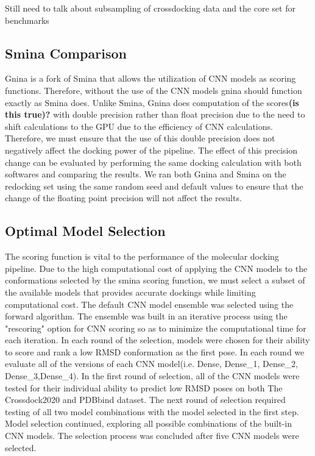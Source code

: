 \documentclass[journal=jcisd8,manuscript=article]{achemso}
\begin{document}
Still need to talk about subsampling of crossdocking data and the core set for benchmarks

\subsection{Smina Comparison}
Gnina is a fork of Smina that allows the utilization of CNN models as scoring functions. Therefore, without the use of the CNN models gnina should function exactly as Smina does. Unlike Smina, Gnina does computation of the scores\textbf{(is this true)?} with double precision rather than float precision due to the need to shift calculations to the GPU due to the efficiency of CNN calculations. Therefore, we must ensure that the use of this double precision does not negatively affect the docking power of the pipeline. The effect of this precision change can be evaluated by performing the same docking calculation with both softwares and comparing the results. We ran both Gnina and Smina on the redocking set using the same random seed and default values to ensure that the change of the floating point precision will not affect the results. 

\subsection{Optimal Model Selection}
The scoring function is vital to the performance of the molecular docking pipeline. Due to the high computational cost of applying the CNN models to the conformations selected by the smina scoring function, we must select a subset of the available models that provides accurate dockings while limiting computational cost. The default CNN model ensemble was selected using the forward algorithm. The ensemble was built in an iterative process using the "rescoring" option for CNN scoring so as to minimize the computational time for each iteration. In each round of the selection, models were chosen for their ability to score and rank a low RMSD conformation as the first pose. In each round we evaluate all of the versions of each CNN model(i.e. Dense, Dense\_1, Dense\_2, Dense\_3,Dense\_4). In the first round of selection, all of the CNN models were tested for their individual ability to predict low RMSD poses on both The Crossdock2020 and PDBbind dataset. The next round of selection required testing of all two model combinations with the model selected in the first step. Model selection continued, exploring all possible combinations of the built-in CNN models. The selection process was concluded after five CNN models were selected.
\end{document}
